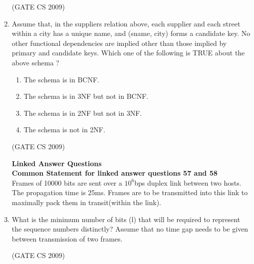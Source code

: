 \documentclass[a4paper, 11pt]{article}
\begin{document}
\begin{enumerate}
    \hfill (GATE CS 2009)
    
    \item Assume that, in the suppliers relation above, each supplier and each street within a city has a unique name, and (sname, city) forms a candidate key. No other functional dependencies are implied other than those implied by primary and candidate keys. Which one of the following is TRUE about the above schema ?
    \begin{enumerate}  
        \item The schema is in BCNF.
        \item The schema is in 3NF but not in BCNF.
        \item The schema is in 2NF but not in 3NF.
        \item The schema is not in 2NF.
    \end{enumerate}
    \hfill (GATE CS 2009)
    
    \textbf{{\LARGE Linked Answer Questions}} \\
    
    {\Large \textbf{Common Statement for linked answer questions 57 and 58}} \\    
    Frames of 10000 bits are sent over a $10^6$bps duplex link between two hosts. The propagation time is 25ms. Frames are to be transmitted into this link to maximally pack them in transit(within the link).
    \item What is the minimum number of bits (l) that will be required to represent the sequence numbers distinctly? Assume that no time gap needs to be given between transmission of two frames.\\

    \begin{enumerate}
    \end{enumerate}

    \hfill (GATE CS 2009)
    

\end{enumerate}
\end{document}

